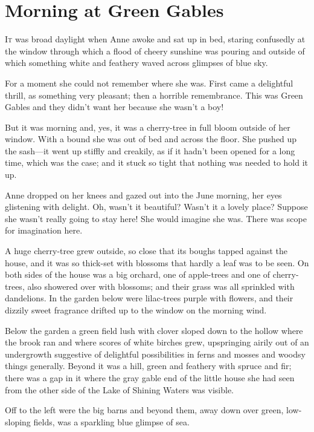 \chapter{Morning at Green Gables}

\lettrine{I}{t} was broad daylight when Anne awoke and sat up in bed, staring confusedly at the window through which a flood of cheery sunshine was pouring and outside of which something white and feathery waved across glimpses of blue sky.

For a moment she could not remember where she was. First came a delightful thrill, as something very pleasant; then a horrible remembrance. This was Green Gables and they didn't want her because she wasn't a boy!

But it was morning and, yes, it was a cherry-tree in full bloom outside of her window. With a bound she was out of bed and across the floor. She pushed up the sash—it went up stiffly and creakily, as if it hadn't been opened for a long time, which was the case; and it stuck so tight that nothing was needed to hold it up.

Anne dropped on her knees and gazed out into the June morning, her eyes glistening with delight. Oh, wasn't it beautiful? Wasn't it a lovely place? Suppose she wasn't really going to stay here! She would imagine she was. There was scope for imagination here.

A huge cherry-tree grew outside, so close that its boughs tapped against the house, and it was so thick-set with blossoms that hardly a leaf was to be seen. On both sides of the house was a big orchard, one of apple-trees and one of cherry-trees, also showered over with blossoms; and their grass was all sprinkled with dandelions. In the garden below were lilac-trees purple with flowers, and their dizzily sweet fragrance drifted up to the window on the morning wind.

Below the garden a green field lush with clover sloped down to the hollow where the brook ran and where scores of white birches grew, upspringing airily out of an undergrowth suggestive of delightful possibilities in ferns and mosses and woodsy things generally. Beyond it was a hill, green and feathery with spruce and fir; there was a gap in it where the gray gable end of the little house she had seen from the other side of the Lake of Shining Waters was visible.

Off to the left were the big barns and beyond them, away down over green, low-sloping fields, was a sparkling blue glimpse of sea.


